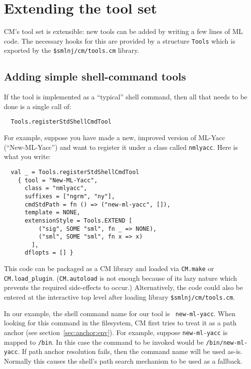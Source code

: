 %

\section{Extending the tool set}
\label{sec:moretools}

CM's tool set is extensible: new tools can be added by writing a few
lines of ML code.  The necessary hooks for this are provided by a
structure {\tt Tools} which is exported by the {\tt \$smlnj/cm/tools.cm}
library.

\subsection{Adding simple shell-command tools}
\label{sec:addshellclass}

If the tool is implemented as a ``typical'' shell command, then all
that needs to be done is a single call of:

\begin{lstlisting}
  Tools.registerStdShellCmdTool
\end{lstlisting}%

For example, suppose you have made a
new, improved version of ML-Yacc (``New-ML-Yacc'') and want to
register it under a class called {\tt nmlyacc}.  Here is what you
write:

\begin{lstlisting}
  val _ = Tools.registerStdShellCmdTool
    { tool = "New-ML-Yacc",
      class = "nmlyacc",
      suffixes = ["ngrm", "ny"],
      cmdStdPath = fn () => ("new-ml-yacc", []),
      template = NONE,
      extensionStyle = Tools.EXTEND [
          ("sig", SOME "sml", fn _ => NONE),
          ("sml", SOME "sml", fn x => x)
        ],
      dflopts = [] }
\end{lstlisting}%

This code can be packaged as a CM library and loaded via {\tt CM.make}
or {\tt CM.load\_plugin}.  ({\tt CM.autoload} is not enough because of
its lazy nature which prevents the required side-effects to occur.)
Alternatively, the code could also be entered at the interactive top
level after loading library {\tt \$smlnj/cm/tools.cm}.

In our example, the shell command name for our tool is {\tt
new-ml-yacc}.  When looking for this command in the filesystem, CM
first tries to treat it as a path anchor (see
section~\ref{sec:anchor:env}).  For example, suppose {\tt new-ml-yacc} is
mapped to {\tt /bin}.  In this case the command to be
invoked would be {\tt /bin/new-ml-yacc}.  If path anchor resolution
fails, then the command name will be used as-is.  Normally this
causes the shell's path search mechanism to be used as a fallback.

